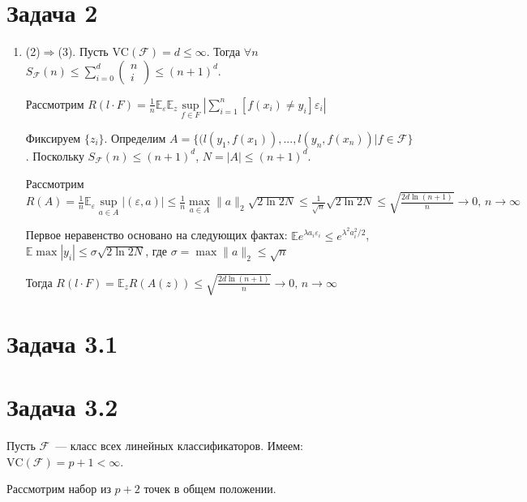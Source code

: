 \documentclass[a4paper]{article}
\newcommand{\VC}{\mbox{VC}}
\newcommand{\F}{\mathcal{F}}
\newcommand{\E}{\mathbb{E}}
\def\eps{\varepsilon}
\begin{document}
\section*{Задача 2}
\begin{enumerate}
\item (2)$\Rightarrow$(3). Пусть $\VC(\F)=d\leqslant\infty$. Тогда $\forall n$ $S_\F(n)\leqslant \sum\limits_{i=0}^d\left(\begin{array}{c}n\\i\end{array}\right)\leqslant (n+1)^d$.

Рассмотрим $R(l\cdot F)=\frac{1}{n}\E_\eps\E_z\sup\limits_{f\in F}|\sum\limits_{i=1}^n [f(x_i)\neq y_i]\eps_i|$

Фиксируем $\{z_i\}$. Определим $A=\{(l(y_1,f(x_1)),...,l(y_n,f(x_n))\big| f\in \F\}$. Поскольку $S_\F(n)\leqslant (n+1)^d$, $N=|A|\leqslant (n+1)^d$.

Рассмотрим $R(A)=\frac{1}{n}\E_\eps\sup\limits_{a\in A}|(\eps, a)|\leqslant\frac{1}{n}\max\limits_{a\in A}\|a\|_2\sqrt{2\ln 2N}\leqslant \frac{1}{\sqrt{n}}\sqrt{2\ln 2N}\leqslant\sqrt{\frac{2d\ln (n+1)}{n}}\to 0,\,n\to\infty$

Первое неравенство основано на следующих фактах: $\E e^{\lambda a_i\eps_i}\leqslant e^{\lambda^2 a_i^2/2}$, $\E\max |y_i|\leqslant\sigma\sqrt{2\ln 2N}$, где $\sigma=\max \|a\|_2\leqslant\sqrt{n}$

Тогда $R(l\cdot F)=\E_z R(A(z))\leqslant\sqrt{\frac{2d\ln (n+1)}{n}}\to 0,\,n\to\infty$
\end{enumerate}
\section*{Задача 3.1}

\section*{Задача 3.2}
Пусть $\F$~--- класс всех линейных классификаторов. Имеем: $\VC(\F)=p+1<\infty$.

Рассмотрим набор из $p+2$ точек в общем положении.
\end{document}

